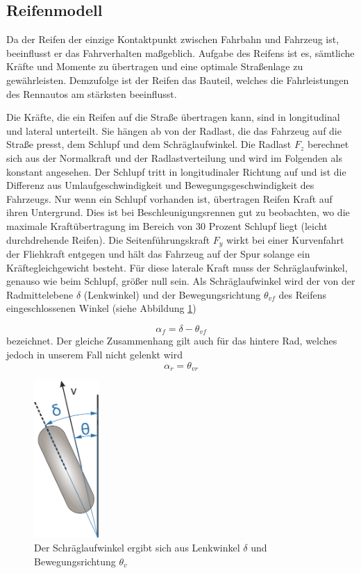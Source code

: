 \documentclass{like}
\begin{document}
\subsection{Reifenmodell}
\label{tireModel}
Da der Reifen der einzige Kontaktpunkt zwischen Fahrbahn und Fahrzeug ist, beeinflusst er das Fahrverhalten maßgeblich. Aufgabe des Reifens ist es, sämtliche Kräfte und Momente zu übertragen und eine optimale Straßenlage zu gewährleisten. Demzufolge ist der Reifen das Bauteil, welches die Fahrleistungen des Rennautos am stärksten beeinflusst.

Die Kräfte, die ein Reifen auf die Straße übertragen kann, sind in longitudinal und lateral unterteilt. Sie hängen ab von der Radlast, die das Fahrzeug auf die Straße presst, dem Schlupf und dem Schräglaufwinkel. Die Radlast \(F_z\) berechnet sich aus der Normalkraft und der Radlastverteilung und wird im Folgenden als konstant angesehen. Der Schlupf tritt in longitudinaler Richtung auf und ist die Differenz aus Umlaufgeschwindigkeit und Bewegungsgeschwindigkeit des Fahrzeugs.
Nur wenn ein Schlupf vorhanden ist, übertragen Reifen Kraft auf ihren Untergrund. Dies ist bei Beschleunigungsrennen gut zu beobachten, wo die maximale Kraftübertragung im Bereich von 30 Prozent Schlupf liegt (leicht durchdrehende Reifen).
Die Seitenführungskraft \(F_y\) wirkt bei einer Kurvenfahrt der Fliehkraft entgegen und hält das Fahrzeug auf der Spur solange ein Kräftegleichgewicht besteht. Für diese laterale Kraft muss der Schräglaufwinkel, genauso wie beim Schlupf, größer null sein. Als Schräglaufwinkel wird der von der Radmittelebene \(\delta\) (Lenkwinkel) und der Bewegungsrichtung \(\theta_{vf}\) des Reifens eingeschlossenen Winkel (siehe Abbildung \ref{fig:linLat})

\begin{equation}
\alpha_f = \delta - \theta_{vf}
\end{equation}
bezeichnet. Der gleiche Zusammenhang gilt auch für das hintere Rad, welches jedoch in unserem Fall nicht gelenkt wird
\begin{equation}
\alpha_r = \theta_{vr}
\end{equation}


\begin{figure}[ht!]
	\centering
	\includegraphics[width=70pt]{Abbildungen/slipAngle.png}
	\caption{Der Schräglaufwinkel ergibt sich aus Lenkwinkel \(\delta\) und Bewegungsrichtung \(\theta_{v}\)}
	\label{fig:linLat}
\end{figure}
\end{document}
